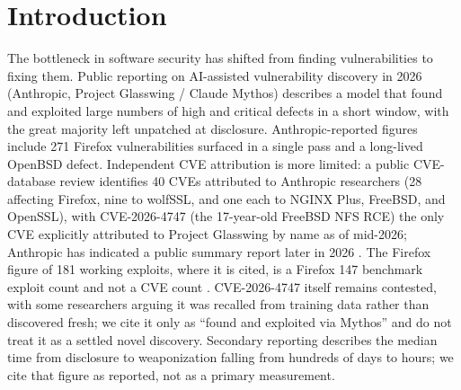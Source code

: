 \documentclass[11pt]{article}
\begin{document}
\begin{abstract}
own construction. False positives are 0 across all 1,045 real clinical files in four modalities and five datasets (575 chest CT, 100 abdomen CT, 120 brain MR, 150 chest XR, 100 mammograms; one-sided 95 percent upper bound 0.29 percent on the clinical pool, 0.26 percent pooled across all 1,170 benign files); CDR rebuilds every native and lossless file bit-exact (623 in the fidelity harness plus the 470 additional files) across 13 transfer syntaxes. Single-threaded on commodity hardware, the scanner runs at 254 files per second across the 945-file corpus (peak 265 MiB), and the CDR rebuild runs at 63 to 174 files per second depending on whether the codec sandbox is invoked. As a secondary contribution, we audit residual re-identification risk across 1,045 public ``de-identified'' files across five datasets and find substantial pixel-domain risk (facial-geometry features on 96.7 percent of head MR, burned-in text on 89.3 percent of chest radiographs and 52.0 percent of mammograms) that current tag anonymization is structurally unable to fix. DicomLock is positioned as a compensating control for the systems an automated patch loop cannot reach, not as a replacement for patching.
\end{abstract}

\section{Introduction}

The bottleneck in software security has shifted from finding vulnerabilities to fixing them. Public reporting on AI-assisted vulnerability discovery in 2026 (Anthropic, Project Glasswing / Claude Mythos) \cite{ref1,ref2,ref3} describes a model that found and exploited large numbers of high and critical defects in a short window, with the great majority left unpatched at disclosure. Anthropic-reported figures include 271 Firefox vulnerabilities surfaced in a single pass and a long-lived OpenBSD defect. Independent CVE attribution is more limited: a public CVE-database review identifies 40 CVEs attributed to Anthropic researchers (28 affecting Firefox, nine to wolfSSL, and one each to NGINX Plus, FreeBSD, and OpenSSL), with CVE-2026-4747 (the 17-year-old FreeBSD NFS RCE) the only CVE explicitly attributed to Project Glasswing by name as of mid-2026; Anthropic has indicated a public summary report later in 2026 \cite{ref26}. The Firefox figure of 181 working exploits, where it is cited, is a Firefox 147 benchmark exploit count and not a CVE count \cite{ref26}. CVE-2026-4747 itself remains contested, with some researchers arguing it was recalled from training data rather than discovered fresh; we cite it only as ``found and exploited via Mythos'' and do not treat it as a settled novel discovery. Secondary reporting describes the median time from disclosure to weaponization falling from hundreds of days to hours; we cite that figure as reported, not as a primary measurement.
\end{document}
